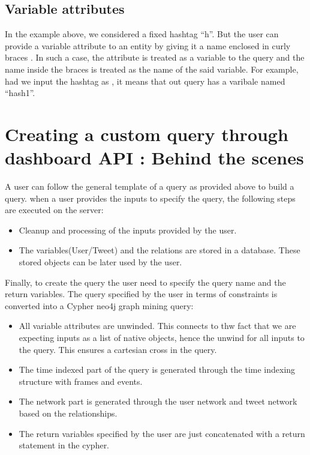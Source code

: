 \documentclass[letterpaper,10pt,english]{sphinxmanual}
\begin{document}
\subsection{Variable attributes}
\label{\detokenize{neo4j_query_generation:variable-attributes}}
In the example above, we considered a fixed hashtag “h”. But the user can provide a variable attribute to an entity by giving it a name enclosed in curly braces \sphinxtitleref{\{\}}. In such a case, the attribute is treated as a variable to the query and the name inside the braces is treated as the name of the said variable. For example, had we input the hashtag as , it means that out query has a varibale named “hash1”.


\section{Creating a custom query through dashboard API : Behind the scenes}
\label{\detokenize{neo4j_query_generation:creating-a-custom-query-through-dashboard-api-behind-the-scenes}}
A user can follow the general template of a query as provided above to build a query.
when a user provides the inputs to specify the query, the following steps are executed on the server:
\begin{itemize}
\item {} 
Cleanup and processing of the inputs provided by the user.

\item {} 
The variables(User/Tweet) and the relations are stored in a database. These stored objects can be later used by the user.

\end{itemize}

Finally, to create the query the user need to specify the query name and the return variables. The query specified by the user in terms of constraints is converted into a Cypher neo4j graph mining query:
\begin{itemize}
\item {} 
All variable attributes are unwinded. This connects to thw fact that we are expecting inputs as a list of native objects, hence the unwind for all inputs to the query. This ensures a cartesian cross in the query.

\item {} 
The time indexed part of the query is generated through the time indexing structure with frames and events.

\item {} 
The network part is generated through the user network and tweet network based on the relationships.

\item {} 
The return variables specified by the user are just concatenated with a return statement in the cypher.

\end{itemize}
\end{document}

